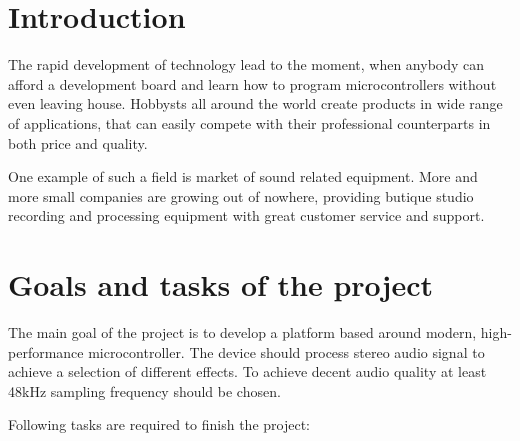 \documentclass[a4paper,twoside,12pt]{book}
\begin{document}
\chapter{Introduction}
The rapid development of technology lead to the moment, when anybody can afford a development board 
and learn how to program microcontrollers without even leaving house.
Hobbysts all around the world create products in wide range of applications, that can easily compete
with their professional counterparts in both price and quality.

One example of such a field is market of sound related equipment.
More and more small companies are growing out of nowhere,
providing butique studio recording and processing equipment with great customer service and support.




\chapter{Goals and tasks of the project}
The main goal of the project is to develop a platform based around modern, high-performance microcontroller.
The device should process stereo audio signal to achieve a selection of different effects.
To achieve decent audio quality at least 48kHz sampling frequency should be chosen.

Following tasks are required to finish the project:
\end{document}
